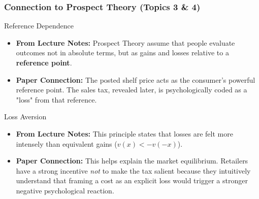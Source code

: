 \documentclass{beamer}
\begin{document}
\begin{frame}
\frametitle{Connection to Prospect Theory (Topics 3 \& 4)}

\begin{block}{Reference Dependence}
\begin{itemize}
    \item \textbf{From Lecture Notes:} Prospect Theory assume that people evaluate outcomes not in absolute terms, but as gains and losses relative to a \textbf{reference point}.
    \item \textbf{Paper Connection:} The posted shelf price acts as the consumer's powerful reference point. The sales tax, revealed later, is psychologically coded as a "loss" from that reference.
\end{itemize}
\end{block}

\begin{exampleblock}{Loss Aversion}
\begin{itemize}
    \item \textbf{From Lecture Notes:} This principle states that losses are felt more intensely than equivalent gains ($v(x) < -v(-x)$).
    \item \textbf{Paper Connection:} This helps explain the market equilibrium. Retailers have a strong incentive \textit{not} to make the tax salient because they intuitively understand that framing a cost as an explicit loss would trigger a stronger negative psychological reaction.
\end{itemize}
\end{exampleblock}

\end{frame}
\end{document}
